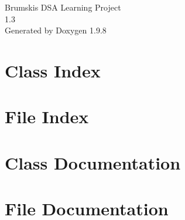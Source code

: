 \documentclass[twoside]{book}
\newcommand{\+}{\discretionary{\mbox{\scriptsize$\hookleftarrow$}}{}{}}
\newcommand{\clearemptydoublepage}{%
    \newpage{\pagestyle{empty}\cleardoublepage}%
  }
\begin{document}
  \raggedbottom
    \hypersetup{pageanchor=false,
                bookmarksnumbered=true,
                pdfencoding=unicode
               }
  \begin{titlepage}
  \vspace*{7cm}
  \begin{center}%
  {\Large Brumski\textquotesingle{}s DSA Learning Project}\\
  [1ex]\large 1.\+3 \\
  \vspace*{1cm}
  {\large Generated by Doxygen 1.9.8}\\
  \end{center}
  \end{titlepage}
  \clearemptydoublepage
  \tableofcontents
  \clearemptydoublepage
  \hypersetup{pageanchor=true}
\chapter{Class Index}

\chapter{File Index}

\chapter{Class Documentation}








\chapter{File Documentation}







  \backmatter
  \newpage
  \clearemptydoublepage
  \printindex
\end{document}
